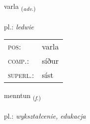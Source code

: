 \documentclass[frontgrid, backgrid]{flacards}\usepackage[]{graphicx}\usepackage[]{xcolor}
\begin{document}
\renewcommand{\flhead}{\vskip5pt \fboxsep=0pt {\small\bfseries\footnotesize Atviksorð | przysłówek}}
\renewcommand{\fcfoot}{\vskip5pt \fboxsep=0pt \hspace{2pt}{\small\bfseries\footnotesize 1K}}

\renewcommand{\blhead}{\vskip5pt {\small\bfseries\footnotesize Atviksorð | przysłówek }}
\renewcommand{\bcfoot}{\vskip5pt \hspace{2pt}{\small\bfseries\footnotesize 1K}}


{varla \small{\textsubscript{(\textit{adv.})}} \\[1ex] %
\textphonetic{[vartla]} \\
pl.: \emph{ledwie} \\  [2ex]
\renewcommand*{\arraystretch}{0.8}
\begin{tabular}{ll}
\textsc{pos}: & varla \\ 
\textsc{comp.}: & síður \\ 
\textsc{superl.}: & síst \\
\end{tabular}
}

\renewcommand{\flhead}{\vskip5pt \fboxsep=0pt {\small\bfseries\footnotesize Nafnorð | rzeczownik}}
\renewcommand{\fcfoot}{\vskip5pt \fboxsep=0pt \hspace{2pt}{\small\bfseries\footnotesize 1K}}

\renewcommand{\blhead}{\vskip5pt {\small\bfseries\footnotesize Nafnorð | rzeczownik }}
\renewcommand{\bcfoot}{\vskip5pt \hspace{2pt}{\small\bfseries\footnotesize 1K}}


{menntun \small{\textsubscript{(\textit{f.})}} \\[1ex] %
 \\
pl.: \emph{wykształcenie, edukacja} \\  [2ex]
\renewcommand*{\arraystretch}{0.8}
}
\end{document}
